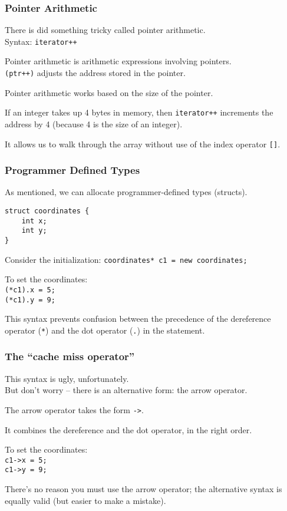 \begin{frame}
\frametitle{Pointer Arithmetic}

There is did something tricky called \alert{pointer arithmetic}.\\
\quad Syntax: \texttt{iterator++}

Pointer arithmetic is arithmetic expressions involving pointers.\\
\quad \texttt{(ptr++)} adjusts the address stored in the pointer.

Pointer arithmetic works based on the size of the pointer.

If an integer takes up 4 bytes in memory, then \texttt{iterator++} increments the address by 4 (because 4 is the size of an integer).

It allows us to walk through the array without use of the index operator \texttt{[]}.

\end{frame}




\begin{frame}[fragile]
\frametitle{Programmer Defined Types}

As mentioned, we can allocate programmer-defined types (structs). 

\begin{verbatim}
struct coordinates {
    int x;
    int y;
}
\end{verbatim}

Consider the initialization: \texttt{coordinates* c1 = new coordinates;}


To set the coordinates:\\
\quad \texttt{(*c1).x = 5;\\
\quad (*c1).y = 9;}

This syntax prevents confusion between the precedence of the dereference operator (\texttt{*}) and the dot operator (\texttt{.}) in the statement.

\end{frame}



\begin{frame}
\frametitle{The ``cache miss operator''}

This syntax is ugly, unfortunately.\\
\quad But don't worry -- there is an alternative form: the arrow operator.

The arrow operator takes the form \texttt{->}.

It combines the dereference and the dot operator, in the right order.

To set the coordinates:\\
\quad \texttt{c1->x = 5;\\
\quad c1->y = 9;}

There's no reason you must use the arrow operator; the alternative syntax is equally valid (but easier to make a mistake).

\end{frame}


